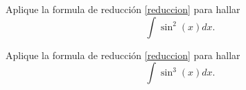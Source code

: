  \begin{problema}
  Aplique la formula de reducci\'on \eqref{reduccion} para hallar 
  $$
  \displaystyle \int \sin^{2}(x)dx.
  $$
 \end{problema}




  \begin{problema}
  Aplique la formula de reducci\'on \eqref{reduccion} para hallar 
  $$
  \displaystyle \int \sin^{3}(x)dx.
  $$
 \end{problema}
%
%
%
%
%
%
%
%
%
%
%
%
%
%
%
%
%
%
%
%
%
%
%
%
%
%
%
%
%
%
% 
% 
% 
% 
%
% 
% 
